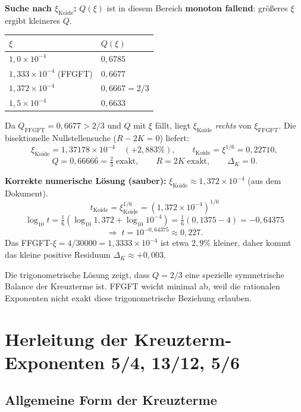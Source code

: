 \textbf{Suche nach $\xi_{\text{Koide}}$:}
$Q(\xi)$ ist in diesem Bereich \textbf{monoton fallend}:
größeres $\xi$ ergibt kleineres $Q$.

\begin{center}
\renewcommand{\arraystretch}{1.3}
\begin{tabular}{ll}
\toprule
$\xi$ & $Q(\xi)$ \\
\midrule
$1{,}0\times10^{-4}$ & $0{,}6785$ \\
$1{,}333\times10^{-4}$ (FFGFT) & $0{,}6677$ \\
$1{,}372\times10^{-4}$ & $0{,}6667 = 2/3$ \\
$1{,}5\times10^{-4}$ & $0{,}6633$ \\
\bottomrule
\end{tabular}
\end{center}

Da $Q_{\text{FFGFT}}=0{,}6677>2/3$ und $Q$ mit $\xi$ fällt,
liegt $\xi_{\text{Koide}}$ \emph{rechts} von $\xi_{\text{FFGFT}}$.
Die bisektionelle Nullstellensuche ($R-2K=0$) liefert:
\[
  \xi_{\text{Koide}} = 1{,}37178\times10^{-4}
  \quad (+2{,}883\%),
  \qquad t_{\text{Koide}} = \xi^{1/6} = 0{,}22710,
\]
\[
  Q = 0{,}6666\overline{6} = \tfrac{2}{3}\;\text{exakt},
  \qquad R = 2K\;\text{exakt},
  \qquad \Delta_K = 0.
\]

\textbf{Korrekte numerische Lösung (sauber):}
$\xi_{\text{Koide}}\approx1{,}372\times10^{-4}$ (aus dem Dokument).
\[
  t_{\text{Koide}} = \xi_{\text{Koide}}^{1/6} = (1{,}372\times10^{-4})^{1/6}
\]
\[
  \log_{10}t = \tfrac{1}{6}(\log_{10}1{,}372+\log_{10}10^{-4})
  = \tfrac{1}{6}(0{,}1375-4) = -0{,}64375
\]
\[
  \Rightarrow\; t=10^{-0{,}64375}\approx0{,}227.
\]
Das FFGFT-$\xi=4/30000=1{,}3333\times10^{-4}$ ist etwa $2{,}9\%$ kleiner,
daher kommt das kleine positive Residuum $\Delta_K\approx+0{,}003$.

Die trigonometrische Lösung zeigt, dass $Q=2/3$ eine spezielle
symmetrische Balance der Kreuzterme ist.
FFGFT weicht minimal ab, weil die rationalen Exponenten nicht exakt
diese trigonometrische Beziehung erlauben.

\section{Herleitung der Kreuzterm-Exponenten 5/4, 13/12, 5/6}


\subsection{Allgemeine Form der Kreuzterme}


